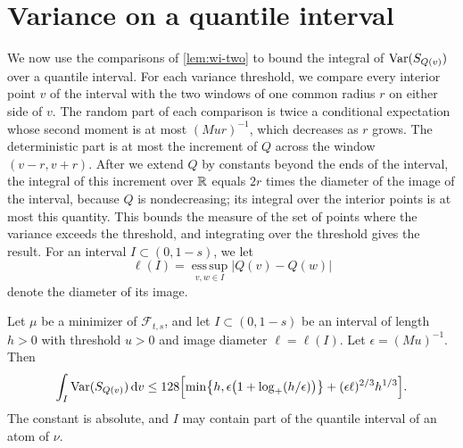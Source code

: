 \section{Variance on a quantile interval}\label{sec:wi-interval}

We now use the comparisons of \cref{lem:wi-two} to bound the
integral of $\operatorname{Var}(S_{Q(v)})$ over a quantile interval. For each variance
threshold, we compare every interior point $v$ of the interval with the
two windows of one common radius $r$ on either side of $v$. The random
part of each comparison is twice a conditional expectation whose second
moment is at most $(Mur)^{-1}$, which decreases as $r$ grows. The
deterministic part is at most the increment of $Q$ across the window
$(v-r,v+r)$. After we extend $Q$ by constants beyond the ends of the
interval, the integral of this increment over $\mathbb R$ equals $2r$ times the
diameter of the image of the interval, because $Q$ is nondecreasing; its
integral over the interior points is at most this quantity. This bounds the measure of the
set of points where the variance exceeds the threshold, and integrating
over the threshold gives the result. For an interval $I\subset(0,1-s)$,
we let
\[
 \ell(I)=\operatorname*{ess\,sup}_{v,w\in I}|Q(v)-Q(w)|
\]
denote the diameter of its image.

\begin{proposition}\label{prop:wi-vfs}
Let $\mu$ be a minimizer of $\mathcal F_{t,s}$, and let
$I\subset(0,1-s)$ be an interval of length $h>0$ with threshold $u>0$
and image diameter $\ell=\ell(I)$. Let $\epsilon=(Mu)^{-1}$. Then
\begin{equation}\label{eq:wi-vfs}
 \int_I\operatorname{Var}(S_{Q(v)})\,\mathrm d v
 \le128\Bigl[\min\bigl\{h,\epsilon\bigl(1+\log_+(h/\epsilon)\bigr)\bigr\}
 +(\epsilon\ell)^{2/3}h^{1/3}\Bigr].
\end{equation}
The constant is absolute, and $I$ may contain part of the quantile
interval of an atom of $\nu$.
\end{proposition}

